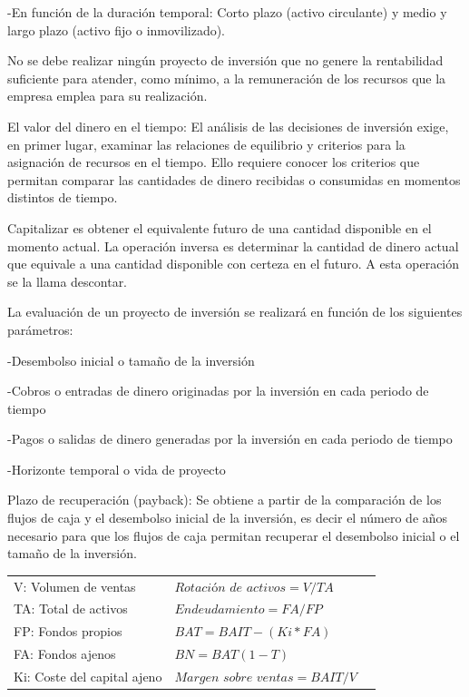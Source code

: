 \documentclass[12pt, twoside, openright]{report} %
\begin{document}
-En función de la duración temporal: Corto plazo (activo circulante) y medio y largo plazo (activo fijo o
inmovilizado).

No se debe realizar ningún proyecto de inversión que no genere la rentabilidad suficiente para atender, como
mínimo, a la remuneración de los recursos que la empresa emplea para su realización.

El valor del dinero en el tiempo: El análisis de las decisiones de inversión exige, en primer lugar, examinar
las relaciones de equilibrio y criterios para la asignación de recursos en el tiempo. Ello requiere conocer los
criterios que permitan comparar las cantidades de dinero recibidas o consumidas en momentos distintos de
tiempo.

Capitalizar es obtener el equivalente futuro de una cantidad disponible en el momento actual. La operación
inversa es determinar la cantidad de dinero actual que equivale a una cantidad disponible con certeza en el
futuro. A esta operación se la llama descontar.

La evaluación de un proyecto de inversión se realizará en función de los siguientes parámetros:

-Desembolso inicial o tamaño de la inversión

-Cobros o entradas de dinero originadas por la inversión en cada periodo de tiempo

-Pagos o salidas de dinero generadas por la inversión en cada periodo de tiempo

-Horizonte temporal o vida de proyecto
\pagebreak

Plazo de recuperación (payback): Se obtiene a partir de la comparación de los flujos de caja y el desembolso
inicial de la inversión, es decir el número de años necesario para que los flujos de caja permitan recuperar el
desembolso inicial o el tamaño de la inversión.
\begin{table}[H]
	\begin{tabular}{lll}
V: Volumen de ventas & $\textit{Rotación de activos} = V / TA$ \\
TA: Total de activos & $\textit{Endeudamiento} = FA / FP$ \\
FP: Fondos propios & $BAT = BAIT - (Ki * FA)$ \\
FA: Fondos ajenos & $BN = BAT (1 - T)$ \\
Ki: Coste del capital ajeno & $\textit{Margen sobre ventas} = BAIT / V$ \\
	\end{tabular}
\end{table}
\end{document}
